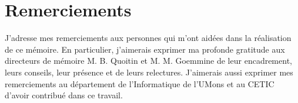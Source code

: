 \chapter*{Remerciements}

J'adresse mes remerciements aux personnes qui m'ont aidées dans la réalisation de ce mémoire.
En particulier, j'aimerais exprimer ma profonde gratitude aux directeurs de mémoire M. B. Quoitin et M. M. Goemmine de leur encadrement, leurs conseils,  leur présence et  de leurs relectures. J'aimerais aussi  exprimer mes remerciements au département de l'Informatique de l'UMons  et au CETIC  d'avoir contribué dans ce travail.


